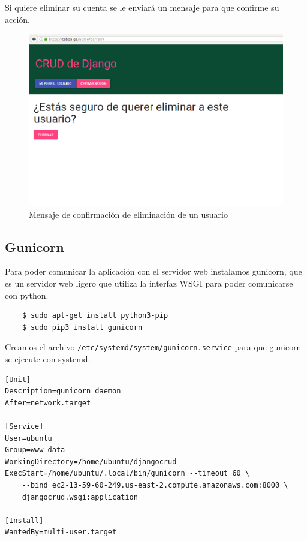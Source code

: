 \documentclass[12pt]{article}
\begin{document}
Si quiere eliminar su cuenta se le enviará un mensaje para que confirme su acción. \\
\begin{figure}[H]
  \centering
  \includegraphics[width=\textwidth]{crud/app7}
  \caption{Mensaje de confirmación de eliminación de un usuario}
\end{figure}

\subsection{Gunicorn}

Para poder comunicar la aplicación con el servidor web instalamos \textsf{gunicorn}, que es un servidor web ligero que utiliza la interfaz WSGI para poder comunicarse con \textsf{python}.
\begin{verbatim}
    $ sudo apt-get install python3-pip
    $ sudo pip3 install gunicorn
\end{verbatim}

Creamos el archivo \texttt{/etc/systemd/system/gunicorn.service} para que \textsf{gunicorn} se ejecute con \textsf{systemd}.

\begin{verbatim}
[Unit]
Description=gunicorn daemon
After=network.target

[Service]
User=ubuntu
Group=www-data
WorkingDirectory=/home/ubuntu/djangocrud
ExecStart=/home/ubuntu/.local/bin/gunicorn --timeout 60 \
    --bind ec2-13-59-60-249.us-east-2.compute.amazonaws.com:8000 \
    djangocrud.wsgi:application

[Install]
WantedBy=multi-user.target
\end{verbatim}
\end{document}

